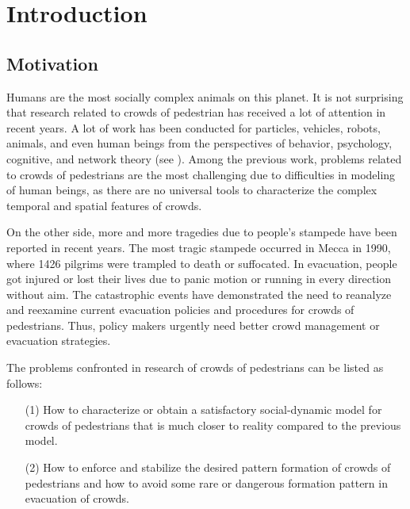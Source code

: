 \documentclass[]{chencao}
\begin{document}
\chapter{Introduction}


\begin{frontmatter}
\end{frontmatter}

\section{Motivation}

Humans are the most socially complex animals on this planet. It is not
surprising that research related to crowds of pedestrian has received
a lot of attention in recent years. A lot of work has been
conducted for particles, vehicles, robots, animals, and
even human beings from the perspectives of behavior, psychology,
cognitive, and network theory (see
\cite{1.Couzin2008,1.Couzin2005,1.Czirok1999,1.Spieser2009,1.Moussaid2011}).
{Among the previous work, problems related to crowds of pedestrians are
the most challenging due to difficulties in modeling of human beings,
as there are no universal tools to characterize the complex temporal and
spatial features of crowds.}

On the other side, more and more tragedies due to people's stampede have
been reported in recent years. The most tragic stampede occurred in
Mecca in 1990, where 1426 pilgrims were trampled to death or suffocated.
In evacuation, people got injured or lost their lives due to panic motion or running in every direction without aim. The catastrophic events
have demonstrated the need to reanalyze and
reexamine current evacuation policies and procedures for crowds of
pedestrians. {Thus, policy makers urgently need better crowd
management or evacuation strategies.}

The problems confronted in research of crowds of pedestrians can be
listed as follows:
%
\begin{enumerate}
\item[(1)] How to characterize or obtain a satisfactory social-dynamic model for
crowds of pedestrians that is much closer to reality compared to the
previous model.
\item[(2)] How to enforce and stabilize the desired pattern formation of crowds of
pedestrians and how to avoid some rare or dangerous formation pattern
in evacuation of crowds.
\end{enumerate}
\end{document}
